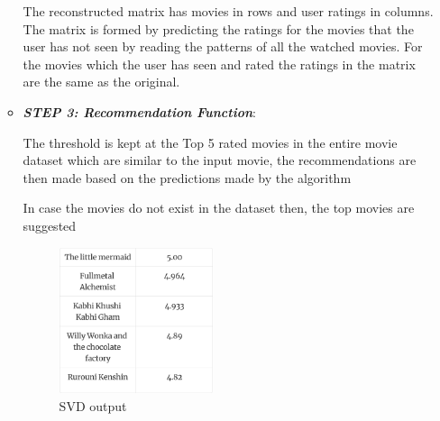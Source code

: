 \documentclass[a4paper,10pt]{article}
\begin{document}
\begin{enumerate}
\begin{itemize}
    The reconstructed matrix has movies in rows and user ratings in columns. The matrix is formed by predicting the ratings for the movies that the user has not seen by reading the patterns of all the watched movies. For the movies which the user has seen and rated the ratings in the matrix are the same as the original.

\item \textbf{\textit{STEP 3: Recommendation Function}}:

    The threshold is kept at the Top 5 rated movies in the entire movie dataset which are similar to the input movie, the recommendations are then made based on the predictions made by the algorithm
    
    In case the movies do not exist in the dataset then, the top movies are suggested
\begin{figure} [H]
    \centering
    \includegraphics[width=4.5cm]{figures/svd_output.png}
    \caption{SVD output}
    \label{svd}
\end{figure}


\end{itemize}
\end{enumerate}
\end{document}
